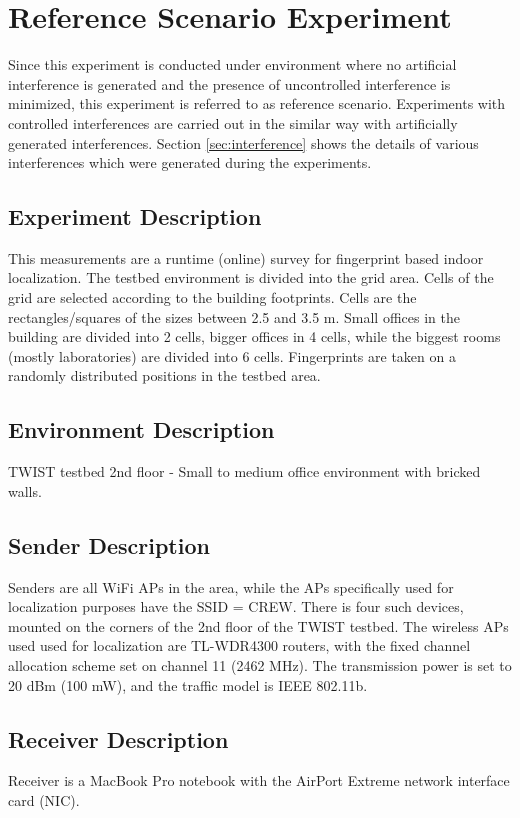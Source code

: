 \documentclass[11pt,a4paper,headinclude,footinclude,chapterprefix=on]{scrreprt}
\begin{document}
\section{Reference Scenario Experiment} Since this experiment is conducted under environment where no artificial interference is generated and the presence of uncontrolled interference is minimized, this experiment is referred to as reference scenario. Experiments with controlled interferences are carried out in the similar way with artificially generated interferences. Section \ref{sec:interference} shows the details of various interferences which were generated during the experiments.

\subsection{Experiment Description} This measurements are a runtime (online) survey for fingerprint based indoor localization. The testbed environment is divided into the grid area. Cells of the grid are selected according to the building footprints. Cells are the rectangles/squares of the sizes between 2.5 and 3.5 m. Small offices in the building are divided into 2 cells, bigger offices in 4 cells, while the biggest rooms (mostly laboratories) are divided into 6 cells. Fingerprints are taken on a randomly distributed positions in the testbed area.

\subsection{Environment Description} TWIST testbed 2nd floor - Small to medium office environment with bricked walls.

\subsection{Sender Description} Senders are all WiFi APs in the area, while the APs specifically used for localization purposes have the SSID = CREW. There is four such devices, mounted on the corners of the 2nd floor of the TWIST testbed. The wireless APs used used for localization are TL-WDR4300 routers, with the fixed channel allocation scheme set on channel 11 (2462 MHz). The transmission power is set to 20 dBm (100 mW), and the traffic model is IEEE 802.11b.

\subsection{Receiver Description} Receiver is a MacBook Pro notebook with the AirPort Extreme network interface card (NIC).
\end{document}
